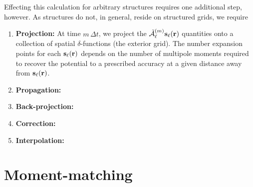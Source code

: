 Effecting this calculation for arbitrary structures requires one additional step, however.
As structures do not, in general, reside on structured grids, we require

\begin{enumerate}
  \item \textbf{Projection:} At time $m \, \Delta t$, we project the $\tilde{\mathcal{A}}^{(m)}_\ell \vb{s}_\ell(\vb{r})$ quantities onto a collection of spatial $\delta$-functions (the exterior grid).
    The number expansion points for each $\vb{s}_\ell(\vb{r})$ depends on the number of multipole moments required to recover the potential to a prescribed accuracy at a given distance away from $\vb{s}_\ell(\vb{r})$.
  \item \textbf{Propagation:}
  \item \textbf{Back-projection:}
  \item \textbf{Correction:}
  \item \textbf{Interpolation:}
\end{enumerate}

\section{Moment-matching}

